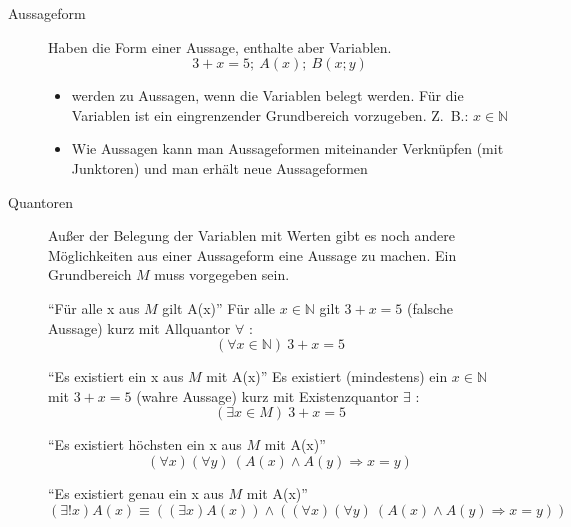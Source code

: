 \begin{description}
    \item[Aussageform] Haben die Form einer Aussage, enthalte aber Variablen.
    \[3 + x = 5;\ A(x);\ B(x;y)\]
    \begin{itemize}
        \item werden zu Aussagen, wenn die Variablen belegt werden.
        Für die Variablen ist ein eingrenzender Grundbereich vorzugeben.
        Z.~B.: $x \in \mathbb{N}$
        \item Wie Aussagen kann man Aussageformen miteinander Verknüpfen (mit Junktoren) und man erhält neue Aussageformen
    \end{itemize}
    \item[Quantoren] Außer der Belegung der Variablen mit Werten gibt es noch andere Möglichkeiten aus einer Aussageform eine Aussage zu machen.
    Ein Grundbereich $M$ muss vorgegeben sein.

    ``Für alle x aus $M$ gilt A(x)'' \newline
    Für alle $x \in \mathbb{N}$ gilt $3 + x = 5$ (falsche Aussage) kurz mit Allquantor $\forall$ :
    \[(\forall x \in \mathbb{N})\ 3 + x = 5\]

    ``Es existiert ein x aus $M$ mit A(x)'' \newline
    Es existiert (mindestens) ein $x \in \mathbb{N}$ mit $3 + x = 5$ (wahre Aussage) kurz mit Existenzquantor $\exists$ :
    \[(\exists x \in M)\ 3 + x = 5\]

    ``Es existiert höchsten ein x aus $M$ mit A(x)''
    \[(\forall x)(\forall y)\ (A(x) \wedge A(y) \Rightarrow x = y)\]

    ``Es existiert genau ein x aus $M$ mit A(x)''
    \[(\exists ! x) A(x) \equiv ((\exists x) A(x)) \wedge ((\forall x)(\forall y)\ (A(x) \wedge A(y) \Rightarrow x = y))\]
\end{description}
